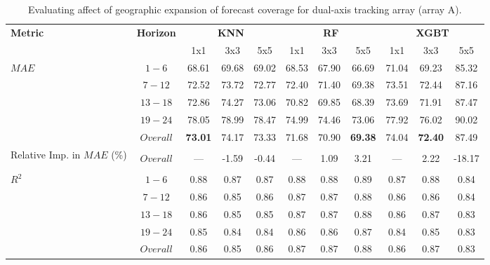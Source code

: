 \begin{table}[h]
\begin{center}
    \caption{Evaluating affect of geographic expansion of forecast coverage for dual-axis tracking array (array A).}
    \begin{tabular}{l c c c c c c c c c c}
        \toprule
        \multirow{2}{*}{\textbf{Metric}} & \multirow{2}{*}{\textbf{Horizon}} & \multicolumn{3}{c}{\textbf{KNN}} & \multicolumn{3}{c}{\textbf{RF}} & \multicolumn{3}{c}{\textbf{XGBT}}\\
        \cmidrule{3-11}
         &  & 1x1 & 3x3 & 5x5 & 1x1 & 3x3 & 5x5 & 1x1 & 3x3 & 5x5 \\
        \midrule
        \multirow{5}{*}{$MAE$} & $1 - 6$ & 68.61 & 69.68 & 69.02 & 68.53 & 67.90 & 66.69 & 71.04 & 69.23 & 85.32 \\
        & $7 - 12$ & 72.52 & 73.72 & 72.77 & 72.40 & 71.40 & 69.38 & 73.51 & 72.44 & 87.16 \\
        & $13 - 18$ & 72.86 & 74.27 & 73.06 & 70.82 & 69.85 & 68.39 & 73.69 & 71.91 & 87.47 \\
        & $19 - 24$ & 78.05 & 78.99 & 78.47 & 74.99 & 74.46 & 73.06 & 77.92 & 76.02 & 90.02 \\
        & $Overall$ & \textbf{73.01} & 74.17 & 73.33 & 71.68 & 70.90 & \textbf{69.38} & 74.04 & \textbf{72.40} & 87.49 \\
        \midrule
        \multirow{3}{5em}{Relative Imp. in $MAE$ (\%)} & & & & & & & & & & \\ 
        & $Overall$ & --- & -1.59 & -0.44 & --- & 1.09 & 3.21 & --- & 2.22 & -18.17 \\
        & & & & & & & & & & \\
        \midrule
        \multirow{5}{*}{$R^2$} & $1 - 6$ & 0.88 & 0.87 & 0.87 & 0.88 & 0.88 & 0.89 & 0.87 & 0.88 & 0.84 \\
        & $7 - 12$ & 0.86 & 0.85 & 0.86 & 0.87 & 0.87 & 0.88 & 0.86 & 0.86 & 0.84 \\
        & $13 - 18$ & 0.86 & 0.85 & 0.85 & 0.87 & 0.87 & 0.88 & 0.86 & 0.87 & 0.83 \\
        & $19 - 24$ & 0.85 & 0.84 & 0.84 & 0.86 & 0.86 & 0.87 & 0.84 & 0.85 & 0.83 \\
        & $Overall$ & 0.86 & 0.85 & 0.86 & 0.87 & 0.87 & 0.88 & 0.86 & 0.87 & 0.83 \\
        \bottomrule
    \end{tabular}
\end{center}
\end{table}


